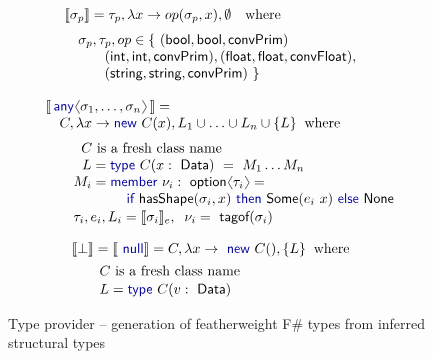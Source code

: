 \documentclass[10pt,preprint,blind,clearpagebib]{sigplanconf}
\newcommand{\langl}{\begin{picture}(4.5,7)
\put(1.1,2.5){\rotatebox{60}{\line(1,0){5.5}}}
\put(1.1,2.5){\rotatebox{300}{\line(1,0){5.5}}}
\end{picture}}
\newcommand{\rangl}{\begin{picture}(4.5,7)
\put(.9,2.5){\rotatebox{120}{\line(1,0){5.5}}}
\put(.9,2.5){\rotatebox{240}{\line(1,0){5.5}}}
\end{picture}}
\newcommand{\kvd}[1]{\textnormal{\textcolor{kvdclr}{\sffamily #1}}}
\newcommand{\ident}[1]{\textnormal{\sffamily #1}}
\newcommand{\tytagof}{\ident{tagof}}
\newcommand{\sem}[1]{\llbracket #1 \rrbracket}
\begin{document}
\begin{figure}
\begin{multicols}{2}
\noindent
\begin{equation*}
\hspace{-1.3em}
\begin{array}{l} 
 \sem{\sigma_p} = \tau_p,\lambda x\rightarrow op(\sigma_p, x),\emptyset\quad\textnormal{where} \\[0.6em] 
 \quad\sigma_p, \tau_p, op\in  \{~ (\ident{bool}, \ident{bool}, \ident{convPrim})\\
 \hspace{2.9em} (\ident{int}, \ident{int}, \ident{convPrim}), (\ident{float},\ident{float},\ident{convFloat}),\\
 \hspace{2.9em} (\ident{string},\ident{string},\ident{convPrim}) ~\}
\end{array} 
\end{equation*}
\vspace{-2em}

\begin{equation*}
\begin{array}{l}
 \sem{\,\kvd{any}\langl\sigma_1, \ldots, \sigma_n\rangl\,} = \\
 \quad C, \lambda x\rightarrow\kvd{new}~C(x), L_1\cup\ldots\cup L_n\cup\{ L \}\;\;\textnormal{where}\\[0.6em]
 \qquad \;\;C~\textnormal{is a fresh class name} \\
 \qquad \;\,\,L = \kvd{type}~C(x:\ident{Data})~=~M_1\ldots M_n \\
 \qquad M_i = \kvd{member}~\nu_i:\ident{option}\langl\tau_i\rangl=\\
 \hspace{5.8em}  \kvd{if}~\ident{hasShape}(\sigma_i, x)~\kvd{then}~ \ident{Some}(e_i~x)~\kvd{else}~\ident{None} \\[0.1em]
 \qquad \tau_i, e_i, L_i = \sem{\sigma_i}_e,\;\; \nu_i=\tytagof{(\sigma_i)}
\end{array}
\end{equation*}
\vspace{-2em}

\begin{equation*}
\hspace{-1.3em}
\begin{array}{l}
 \sem{\bot} = \sem{\kvd{null}} = C, \lambda x\rightarrow \kvd{new}~C(), \{ L \} \;\;\textnormal{where}\\[0.4em]
 \qquad C~\textnormal{is a fresh class name} \\[0.1em]
 \qquad L = \kvd{type}~C(v:\ident{Data})
\end{array}
\end{equation*}
\end{multicols}

\caption{Type provider -- generation of featherweight F\# types from inferred structural types}
\label{fig:tp-generation}
\vspace{-0.5em}
\end{figure}
\end{document}

